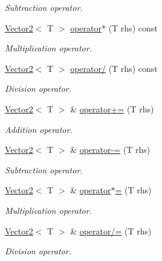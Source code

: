 \begin{DoxyCompactItemize}
\begin{DoxyCompactList}\small\item\em Subtraction operator. \item\end{DoxyCompactList}\item 
\hyperlink{class_vector2}{Vector2}$<$ T $>$ \hyperlink{class_vector2_afe8640177b4a4114196b5d4f6a2ee597}{operator$\ast$} (T rhs) const 
\begin{DoxyCompactList}\small\item\em Multiplication operator. \item\end{DoxyCompactList}\item 
\hyperlink{class_vector2}{Vector2}$<$ T $>$ \hyperlink{class_vector2_a4c504fd30766b8d3f50a1871590147a8}{operator/} (T rhs) const 
\begin{DoxyCompactList}\small\item\em Division operator. \item\end{DoxyCompactList}\item 
\hyperlink{class_vector2}{Vector2}$<$ T $>$ \& \hyperlink{class_vector2_ac9fc3a535e3e2c4a001db064b0572a89}{operator+=} (T rhs)
\begin{DoxyCompactList}\small\item\em Addition operator. \item\end{DoxyCompactList}\item 
\hyperlink{class_vector2}{Vector2}$<$ T $>$ \& \hyperlink{class_vector2_afba0b8c23b74f538ab8cecf8c77d9a17}{operator-\/=} (T rhs)
\begin{DoxyCompactList}\small\item\em Subtraction operator. \item\end{DoxyCompactList}\item 
\hyperlink{class_vector2}{Vector2}$<$ T $>$ \& \hyperlink{class_vector2_ad71db03f38ea0f7b0794bf7c12d04c39}{operator$\ast$=} (T rhs)
\begin{DoxyCompactList}\small\item\em Multiplication operator. \item\end{DoxyCompactList}\item 
\hyperlink{class_vector2}{Vector2}$<$ T $>$ \& \hyperlink{class_vector2_ab50c18ba014384a42cc78be9a36a222c}{operator/=} (T rhs)
\begin{DoxyCompactList}\small\item\em Division operator. \item\end{DoxyCompactList}\item 

\end{DoxyCompactItemize}
